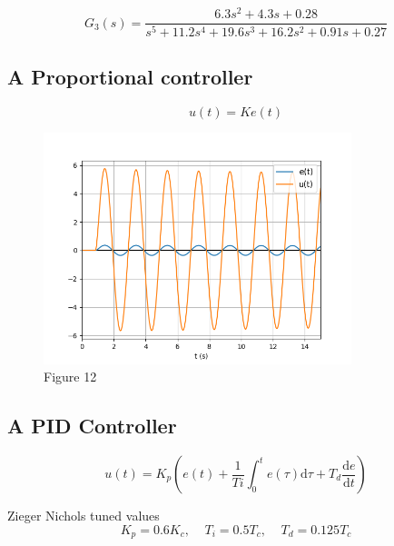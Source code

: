 \documentclass[8pt]{article}
\begin{document}
\begin{equation}
    G_3(s) = \frac{6.3s^2 + 4.3s + 0.28}{s^5 + 11.2s^4 + 19.6s^3 + 16.2s^2 + 0.91s + 0.27}
\end{equation}

\subsection{A Proportional controller}

\begin{equation}
    u(t) = Ke(t)
\end{equation}

\begin{figure}[H]
    \centering
    \includegraphics[width=0.8\textwidth]{figures/FIGURE_12.png}
    \caption{Figure 12}
    \label{fig:figure12}
\end{figure}

\subsection{A PID Controller}

\begin{equation}
    u(t) = K_p \left ( e(t) + \frac{1}{Ti}\int_{0}^{t}e(\tau)\mathrm{d}\tau + T_d\frac{\mathrm{d} e}{\mathrm{d} t} \right )
\end{equation}


Zieger Nichols tuned values
\begin{equation}
    K_p=0.6K_c, \;\;\;\; T_i=0.5T_c, \;\;\;\; T_d = 0.125T_c
\end{equation}
\end{document}
